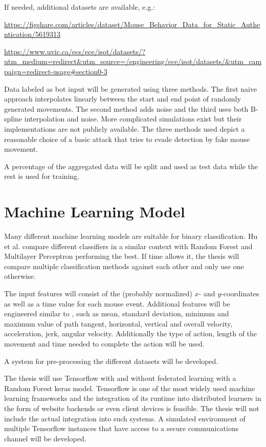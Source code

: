 \documentclass[
    fontsize=12pt,
    headings=small,
    parskip=half,           %
    bibliography=totoc,
    numbers=noenddot,       %
    open=any,               %
    final                   %
    ]{scrreprt}
\begin{document}
If needed, additional datasets are available, e.g.:

\url{https://figshare.com/articles/dataset/Mouse_Behavior_Data_for_Static_Authentication/5619313}

\url{https://www.uvic.ca/ecs/ece/isot/datasets/?utm_medium=redirect&utm_source=/engineering/ece/isot/datasets/&utm_campaign=redirect-usage#section0-3}

Data labeled as bot input will be generated using three methods. The first naive approach interpolates linearly between the start and end point of randomly generated movements. The second method adds noise and the third uses both B-spline interpolation and noise. More complicated simulations exist but their implementations are not publicly available. \cite{8275816} \cite{Nazar2003} The three methods used depict a reasonable choice of a basic attack that tries to evade detection by fake mouse movement.


A percentage of the aggregated data will be split and used as test data while the rest is used for training.


\section{Machine Learning Model}

Many different machine learning models are suitable for binary classification. Hu et al. \cite{8275816} compare different classifiers in a similar context with Random Forest and Multilayer Perceptron performing the best. If time allows it, the thesis will compare multiple classification methods against each other and only use one otherwise.

The input features will consist of the (probably normalized) $x$- and $y$-coordinates as well as a time value for each mouse event. Additional features will be engineered similar to \cite{DBLP:journals/corr/abs-1810-04668}, such as mean, standard deviation, minimum and maximum value of path tangent, horizontal, vertical and overall velocity, acceleration, jerk, angular velocity. Additionally the type of action, length of the movement and time needed to complete the action will be used.

A system for pre-processing the different datasets will be developed.

The thesis will use Tensorflow with and without federated learning with a Random Forest keras model. Tensorflow is one of the most widely used machine learning frameworks and the integration of its runtime into distributed learners in the form of website backends or even client devices is feasible. The thesis will not include the actual integration into such systems. A simulated environment of multiple Tensorflow instances that have access to a secure communications channel will be developed.
\end{document}

